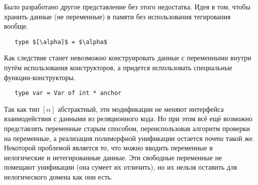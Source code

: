 
Было разработано другое представление без этого недостатка.
Идея в том, чтобы хранить данные (не переменные) в памяти без использования тегирования вообще.

\begin{lstlisting}
   type $[\alpha]$ = $\alpha$
\end{lstlisting}

\noindent Как следствие станет невозможно конструировать данные с переменными внутри путём использования конструкторов,
а придется использовать специальные функции-конструк\-торы.


\begin{lstlisting}
   type var = Var of int * anchor
\end{lstlisting}

\noindent Так как тип $[\alpha]$ абстрактный, эти модификации не меняют интерфейса взаимодействия с данными из реляционного кода.
Но при этом всё ещё возможно представлять переменные старым способом, переиспользовав алгоритм проверки на переменные,
а реализация полиморфной унификации остается \emph{почти} такой же.
Некоторой проблемой является то, что можно вводить переменные в нелогические и нетегированные данные.
Эти свободные переменные не помещают унификации (она сумеет их отличить), но их нельзя оставить для нелогического домена как они есть.



